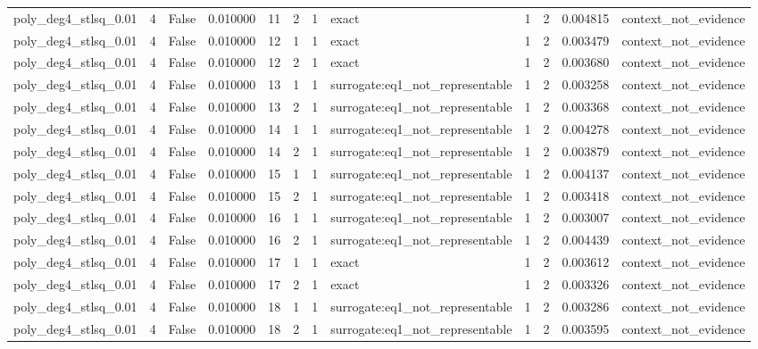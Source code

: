 \begin{tabular}{lrrrrrrlrrrl}
poly\_deg4\_stlsq\_0.01 & 4 & False & 0.010000 & 11 & 2 & 1 & exact & 1 & 2 & 0.004815 & context\_not\_evidence \\
poly\_deg4\_stlsq\_0.01 & 4 & False & 0.010000 & 12 & 1 & 1 & exact & 1 & 2 & 0.003479 & context\_not\_evidence \\
poly\_deg4\_stlsq\_0.01 & 4 & False & 0.010000 & 12 & 2 & 1 & exact & 1 & 2 & 0.003680 & context\_not\_evidence \\
poly\_deg4\_stlsq\_0.01 & 4 & False & 0.010000 & 13 & 1 & 1 & surrogate:eq1\_not\_representable & 1 & 2 & 0.003258 & context\_not\_evidence \\
poly\_deg4\_stlsq\_0.01 & 4 & False & 0.010000 & 13 & 2 & 1 & surrogate:eq1\_not\_representable & 1 & 2 & 0.003368 & context\_not\_evidence \\
poly\_deg4\_stlsq\_0.01 & 4 & False & 0.010000 & 14 & 1 & 1 & surrogate:eq1\_not\_representable & 1 & 2 & 0.004278 & context\_not\_evidence \\
poly\_deg4\_stlsq\_0.01 & 4 & False & 0.010000 & 14 & 2 & 1 & surrogate:eq1\_not\_representable & 1 & 2 & 0.003879 & context\_not\_evidence \\
poly\_deg4\_stlsq\_0.01 & 4 & False & 0.010000 & 15 & 1 & 1 & surrogate:eq1\_not\_representable & 1 & 2 & 0.004137 & context\_not\_evidence \\
poly\_deg4\_stlsq\_0.01 & 4 & False & 0.010000 & 15 & 2 & 1 & surrogate:eq1\_not\_representable & 1 & 2 & 0.003418 & context\_not\_evidence \\
poly\_deg4\_stlsq\_0.01 & 4 & False & 0.010000 & 16 & 1 & 1 & surrogate:eq1\_not\_representable & 1 & 2 & 0.003007 & context\_not\_evidence \\
poly\_deg4\_stlsq\_0.01 & 4 & False & 0.010000 & 16 & 2 & 1 & surrogate:eq1\_not\_representable & 1 & 2 & 0.004439 & context\_not\_evidence \\
poly\_deg4\_stlsq\_0.01 & 4 & False & 0.010000 & 17 & 1 & 1 & exact & 1 & 2 & 0.003612 & context\_not\_evidence \\
poly\_deg4\_stlsq\_0.01 & 4 & False & 0.010000 & 17 & 2 & 1 & exact & 1 & 2 & 0.003326 & context\_not\_evidence \\
poly\_deg4\_stlsq\_0.01 & 4 & False & 0.010000 & 18 & 1 & 1 & surrogate:eq1\_not\_representable & 1 & 2 & 0.003286 & context\_not\_evidence \\
poly\_deg4\_stlsq\_0.01 & 4 & False & 0.010000 & 18 & 2 & 1 & surrogate:eq1\_not\_representable & 1 & 2 & 0.003595 & context\_not\_evidence \\

\end{tabular}
